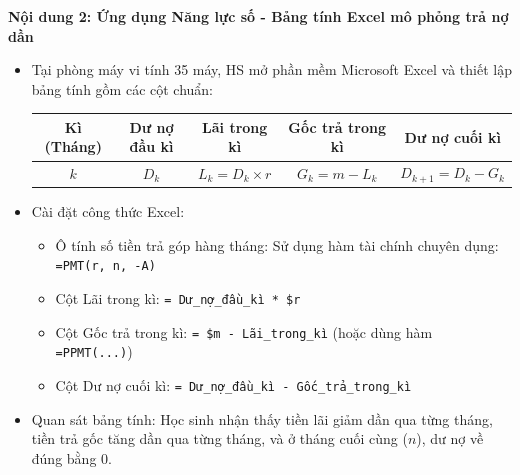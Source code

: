 \documentclass[12pt, a4paper]{article}
\begin{document}
\noindent \textbf{Nội dung 2: Ứng dụng Năng lực số - Bảng tính Excel mô phỏng trả nợ dần}
\begin{itemize}
    \item Tại phòng máy vi tính 35 máy, HS mở phần mềm Microsoft Excel và thiết lập bảng tính gồm các cột chuẩn:
    \begin{center}
    \begin{tabular}{|c|c|c|c|c|}
        \hline
        \textbf{Kì (Tháng)} & \textbf{Dư nợ đầu kì} & \textbf{Lãi trong kì} & \textbf{Gốc trả trong kì} & \textbf{Dư nợ cuối kì} \\
        \hline
        $k$ & $D_k$ & $L_k = D_k \times r$ & $G_k = m - L_k$ & $D_{k+1} = D_k - G_k$ \\
        \hline
    \end{tabular}
    \end{center}
    \item Cài đặt công thức Excel:
    \begin{itemize}
        \item Ô tính số tiền trả góp hàng tháng: Sử dụng hàm tài chính chuyên dụng:
        \texttt{=PMT(r, n, -A)}
        \item Cột Lãi trong kì: \texttt{= Dư\_nợ\_đầu\_kì * \$r}
        \item Cột Gốc trả trong kì: \texttt{= \$m - Lãi\_trong\_kì} (hoặc dùng hàm \texttt{=PPMT(...)})
        \item Cột Dư nợ cuối kì: \texttt{= Dư\_nợ\_đầu\_kì - Gốc\_trả\_trong\_kì}
    \end{itemize}
    \item Quan sát bảng tính: Học sinh nhận thấy tiền lãi giảm dần qua từng tháng, tiền trả gốc tăng dần qua từng tháng, và ở tháng cuối cùng ($n$), dư nợ về đúng bằng $0$.
\end{itemize}
\end{document}
